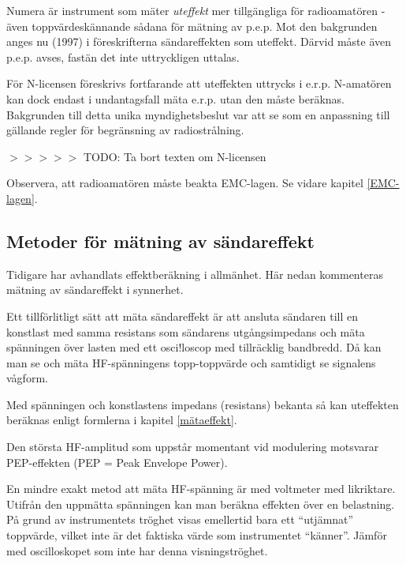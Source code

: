 Numera är instrument som mäter \emph{uteffekt} mer tillgängliga för
radioamatören - även toppvärdeskännande sådana för mätning av
p.e.p. Mot den bakgrunden anges nu (1997) i föreskrifterna
sändareffekten som uteffekt.  Därvid måste även p.e.p. avses, fastän
det inte uttryckligen uttalas.

\begin{rev-raderas}
För N-licensen föreskrivs fortfarande att uteffekten uttrycks i
e.r.p. N-amatören kan dock endast i undantagsfall mäta e.r.p. utan den
måste beräknas. Bakgrunden till detta unika myndighetsbeslut var att
se som en anpassning till gällande regler för begränsning av
radiostrålning.

$>>>>>$ TODO: Ta bort texten om N-licensen
\end{rev-raderas}

Observera, att radioamatören måste beakta EMC-lagen. Se vidare kapitel
\ref{EMC-lagen}.

\subsection{Metoder för mätning av sändareffekt}

Tidigare har avhandlats effektberäkning i allmänhet. Här nedan
kommenteras mätning av sändareffekt i synnerhet.

Ett tillförlitligt sätt att mäta sändareffekt är att ansluta sändaren
till en konstlast med samma resistans som sändarens utgångsimpedans
och mäta spänningen över lasten med ett osci!loscop med tillräcklig
bandbredd. Då kan man se och mäta HF-spänningens topp-toppvärde och
samtidigt se signalens vågform.

Med spänningen och konstlastens impedans (resistans) bekanta så kan
uteffekten beräknas enligt formlerna i kapitel \ref{mätaeffekt}.

Den största HF-amplitud som uppstår momentant vid modulering motsvarar
PEP-effekten (PEP = Peak Envelope Power).

En mindre exakt metod att mäta HF-spänning är med voltmeter med
likriktare.  Utifrån den uppmätta spänningen kan man beräkna effekten
över en belastning. På grund av instrumentets tröghet visas emellertid
bara ett ``utjämnat'' toppvärde, vilket inte är det faktiska värde som
instrumentet ``känner''. Jämför med oscilloskopet som inte har denna
visningströghet.

